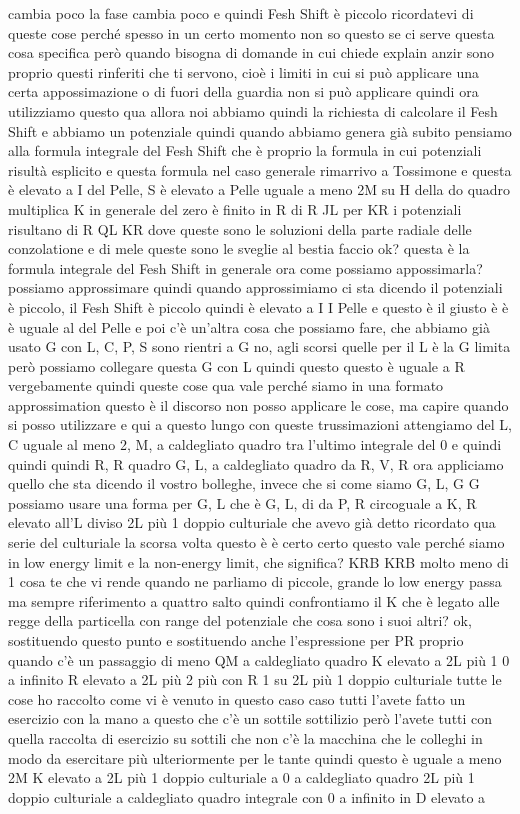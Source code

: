 \begin{soluzione}
{   cambia poco la fase cambia poco e quindi Fesh Shift è piccolo ricordatevi di queste cose perché spesso in un certo momento non so questo se ci serve questa cosa specifica però quando bisogna di domande in cui chiede explain anzir sono proprio questi rinferiti che ti servono, cioè i limiti in cui si può applicare una certa appossimazione o di fuori della guardia non si può applicare quindi ora utilizziamo questo qua allora noi abbiamo quindi la richiesta di calcolare il Fesh Shift e abbiamo un potenziale quindi quando abbiamo genera già subito pensiamo alla formula integrale del Fesh Shift che è proprio la formula in cui potenziali risultà esplicito e questa formula nel caso generale rimarrivo a Tossimone e questa è elevato a I del Pelle, S è elevato a Pelle uguale a meno 2M su H della do quadro multiplica K in generale del zero è finito in R di R JL per KR i potenziali risultano di R QL KR dove queste sono le soluzioni della parte radiale delle conzolatione e di mele queste sono le sveglie al bestia faccio ok? questa è la formula integrale del Fesh Shift in generale ora come possiamo appossimarla? possiamo approssimare quindi quando approssimiamo ci sta dicendo il potenziali è piccolo, il Fesh Shift è piccolo quindi è elevato a I I Pelle e questo è il giusto è è è uguale al del Pelle e poi c'è un'altra cosa che possiamo fare, che abbiamo già usato G con L, C, P, S sono rientri a G no, agli scorsi quelle per il L è la G limita però possiamo collegare questa G con L quindi questo questo è uguale a R vergebamente quindi queste cose qua vale perché siamo in una formato approssimation questo è il discorso non posso applicare le cose, ma capire quando si posso utilizzare e qui a questo lungo con queste trussimazioni attengiamo del L, C uguale al meno 2, M, a caldegliato quadro tra l'ultimo integrale del 0 e quindi quindi quindi R, R quadro G, L, a caldegliato quadro da R, V, R ora appliciamo quello che sta dicendo il vostro bolleghe, invece che si come siamo G, L, G G possiamo usare una forma per G, L che è G, L, di da P, R circoguale a K, R elevato all'L diviso 2L più 1 doppio culturiale che avevo già detto ricordato qua serie del culturiale la scorsa volta questo è è certo certo questo vale perché siamo in low energy limit e la non-energy limit, che significa? KRB KRB molto meno di 1 cosa te che vi rende quando ne parliamo di piccole, grande lo low energy passa ma sempre riferimento a quattro salto quindi confrontiamo il K che è legato alle regge della particella con range del potenziale che cosa sono i suoi altri? ok, sostituendo questo punto e sostituendo anche l'espressione per PR proprio quando c'è un passaggio di meno QM a caldegliato quadro K elevato a 2L più 1 0 a infinito R elevato a 2L più 2 più con R 1 su 2L più 1 doppio culturiale tutte le cose ho raccolto come vi è venuto in questo caso caso tutti l'avete fatto un esercizio con la mano a questo che c'è un sottile sottilizio però l'avete tutti con quella raccolta di esercizio su sottili che non c'è la macchina che le colleghi in modo da esercitare più ulteriormente per le tante quindi questo è uguale a meno 2M K elevato a 2L più 1 doppio culturiale a 0 a caldegliato quadro 2L più 1 doppio culturiale a caldegliato quadro integrale con 0 a infinito in D elevato a 
   
}
\end{soluzione}
